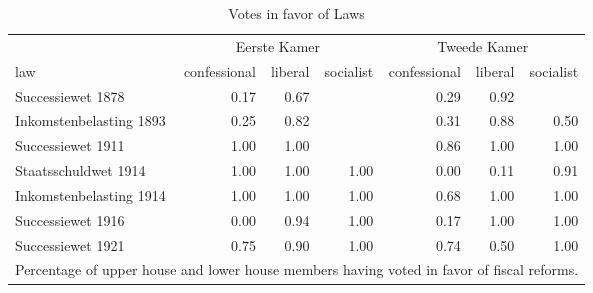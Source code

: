 \begin{table}

\caption{\label{tab:votespercentage}Votes in favor of Laws}
\centering
\begin{tabular}[t]{lrrrrrr}
\toprule
\multicolumn{1}{c}{ } & \multicolumn{3}{c}{Eerste Kamer} & \multicolumn{3}{c}{Tweede Kamer} \\
\cmidrule(l{3pt}r{3pt}){2-4} \cmidrule(l{3pt}r{3pt}){5-7}
law & confessional & liberal & socialist & confessional  & liberal  & socialist \\
\midrule
Successiewet 1878 & 0.17 & 0.67 &  & 0.29 & 0.92 & \\
Inkomstenbelasting 1893 & 0.25 & 0.82 &  & 0.31 & 0.88 & 0.50\\
Successiewet 1911 & 1.00 & 1.00 &  & 0.86 & 1.00 & 1.00\\
Staatsschuldwet 1914 & 1.00 & 1.00 & 1.00 & 0.00 & 0.11 & 0.91\\
Inkomstenbelasting 1914 & 1.00 & 1.00 & 1.00 & 0.68 & 1.00 & 1.00\\
Successiewet 1916 & 0.00 & 0.94 & 1.00 & 0.17 & 1.00 & 1.00\\
Successiewet 1921 & 0.75 & 0.90 & 1.00 & 0.74 & 0.50 & 1.00\\
\bottomrule
\multicolumn{7}{l}{\rule{0pt}{1em}\footnotesize{Percentage of upper house and lower house members having voted in favor of fiscal reforms.}}\\
\end{tabular}
\end{table}
